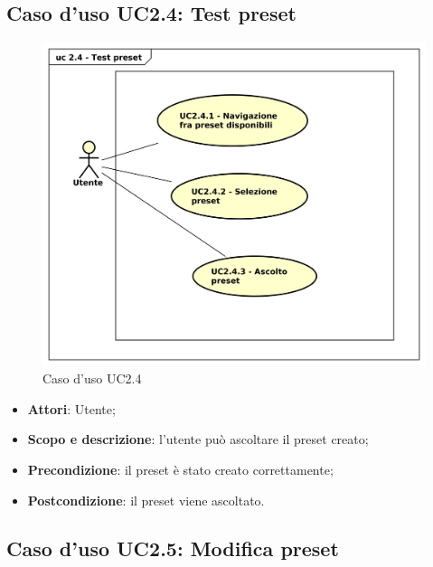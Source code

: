 \subsection{Caso d'uso UC2.4: Test preset}

\begin{figure}[htbp]
\centering
\includegraphics[scale=0.5]{UseCase_17_03_2016/immagini/uc_2_4_test_preset.png}
\captionsetup{labelfont=bf}
\caption{Caso d'uso UC2.4}
\end{figure}

\begin{itemize}
\item \textbf{Attori}: Utente;
\item \textbf{Scopo e descrizione}: l'utente può ascoltare il preset creato;
\item \textbf{Precondizione}: il preset è stato creato correttamente;
\item \textbf{Postcondizione}: il preset viene ascoltato.
\end{itemize}

\subsection{Caso d'uso UC2.5: Modifica preset}

